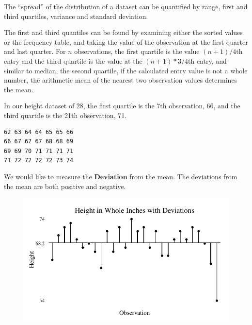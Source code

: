 \documentclass[nohyper,justified]{tufte-handout}\usepackage[]{graphicx}\usepackage[]{color}
\makeatletter
\def\maxwidth{ %
  \ifdim\Gin@nat@width>\linewidth
    \linewidth
  \else
    \Gin@nat@width
  \fi
}
\newenvironment{kframe}{%
 \def\at@end@of@kframe{}%
 \ifinner\ifhmode%
  \def\at@end@of@kframe{\end{minipage}}%
  \begin{minipage}{\columnwidth}%
 \fi\fi%
 \def\FrameCommand##1{\hskip\@totalleftmargin \hskip-\fboxsep
 \colorbox{shadecolor}{##1}\hskip-\fboxsep
     \hskip-\linewidth \hskip-\@totalleftmargin \hskip\columnwidth}%
 \MakeFramed {\advance\hsize-\width
   \@totalleftmargin\z@ \linewidth\hsize
   \@setminipage}}%
 {\par\unskip\endMakeFramed%
 \at@end@of@kframe}
\newenvironment{knitrout}{}{} %
\makeatother
\begin{document}
The ``spread'' of the distribution of a dataset can be quantified by range, first and third quartiles, variance and standard deviation.

The first and third quantiles can be found by examining either the sorted values or the frequency table, and taking the value of the observation at the first quarter and last quarter. For $n$ observations, the first quartile is the value $(n+1)/4$th entry and the third quartile is the value at the $(n+1)*3/4$th entry, and similar to median, the second quartile, if the calculated entry value is not a whole number, the arithmetic mean of the nearest two observation values determines the mean.



In our height dataset of 28, the first quartile is the 7th observation, 66, and the third quartile is the 21th observation, 71.
\begin{knitrout}
\color{fgcolor}\begin{kframe}
\begin{verbatim}
62 63 64 64 65 65 66
66 67 67 67 68 68 69
69 69 70 71 71 71 71
71 72 72 72 72 73 74
\end{verbatim}
\end{kframe}
\end{knitrout}

We would like to measure the \textbf{Deviation} from the mean. The deviations from the mean are both positive and negative.


\begin{figure}
\begin{knitrout}
\color{fgcolor}

{\centering \includegraphics[width=\maxwidth]{figure/graphics-mean-center-chart-1} 

}



\end{knitrout}
\end{figure}
\end{document}
